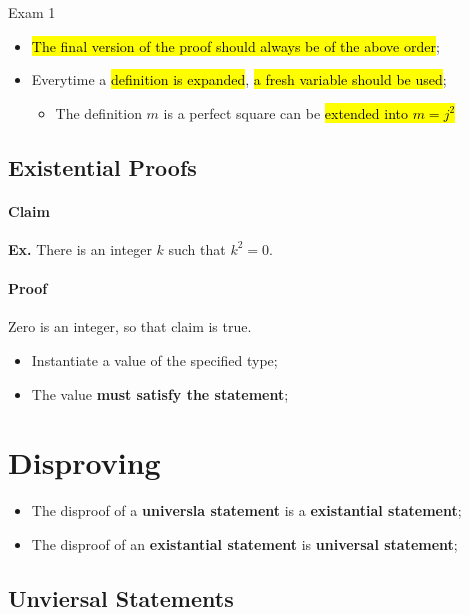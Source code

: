 \documentclass{note}
\begin{document}
\begin{note}{Exam 1}
\begin{itemize}
            \item \hl{The final version of the proof should always be of the above order};

            \item Everytime a \hl{definition is expanded}, \hl{a fresh variable should be used};
            \begin{itemize}
                \item The definition $ m $ is a perfect square can be \hl{extended into $ m = j^{2} $}
            \end{itemize}
        \end{itemize}

        \subsection{Existential Proofs}

        \paragraph{Claim}
        \textbf{Ex.} There is an integer $ k $ such that $ k^{2} = 0 $.

        \paragraph{Proof}
        Zero is an integer, so that claim is true.

        \begin{itemize}
            \item Instantiate a value of the specified type;
            \item The value \textbf{must satisfy the statement};
        \end{itemize}

        \section{Disproving}

        \begin{itemize}
            \item The disproof of a \textbf{universla statement} is a \textbf{existantial statement};
            \item The disproof of an \textbf{existantial statement} is \textbf{universal statement};
        \end{itemize}

        \subsection{Unviersal Statements}


\end{note}
\end{document}
